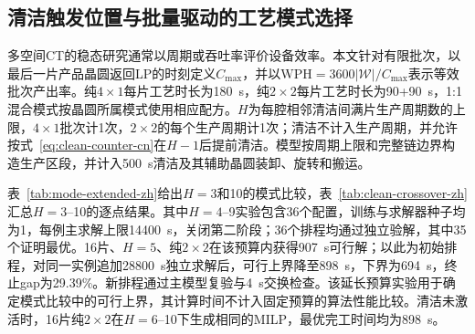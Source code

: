\documentclass[final,5p,times,twocolumn]{elsarticle}
\begin{document}
\subsection{清洁触发位置与批量驱动的工艺模式选择}

多空间CT的稳态研究通常以周期或吞吐率评价设备效率\citep{gu2024multifinger}。本文针对有限批次，以最后一片产品晶圆返回LP的时刻定义$C_{\max}$，并以$\mathrm{WPH}=3600|\mathcal W|/C_{\max}$表示等效批次产出率。纯$4\times1$每片工艺时长为180~s，纯$2\times2$每片工艺时长为90+90~s，1:1混合模式按晶圆所属模式使用相应配方。$H$为每腔相邻清洁间满片生产周期数的上限，$4\times1$批次计1次，$2\times2$的每个生产周期计1次；清洁不计入生产周期，并允许按式~\eqref{eq:clean-counter-cn}在$H-1$后提前清洁。模型按周期上限和完整链边界构造生产区段，并计入500~s清洁及其辅助晶圆装卸、旋转和搬运。

表~\ref{tab:mode-extended-zh}给出$H=3$和10的模式比较，表~\ref{tab:clean-crossover-zh}汇总$H=3$--10的逐点结果。其中$H=4$--9实验包含36个配置，训练与求解器种子均为1，每例主求解上限14400~s，关闭第二阶段；36个排程均通过独立验解，其中35个证明最优。16片、$H=5$、纯$2\times2$在该预算内获得907~s可行解；以此为初始排程，对同一实例追加28800~s独立求解后，可行上界降至898~s，下界为694~s，终止gap为29.39\%。新排程通过主模型复验与4~s交换检查。该延长预算实验用于确定模式比较中的可行上界，其计算时间不计入固定预算的算法性能比较。清洁未激活时，16片纯$2\times2$在$H=6$--10下生成相同的MILP，最优完工时间均为898~s。
\end{document}
